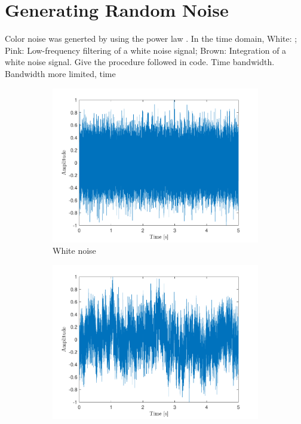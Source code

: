 \documentclass[10pt]{article}
\begin{document}
\section{Generating Random Noise}
Color noise was generted by using the power law $$. In the time domain, White: ; Pink: Low-frequency filtering of a white noise signal; Brown: Integration of a white noise signal. Give the procedure followed in code. Time bandwidth. Bandwidth more limited, time

\begin{figure}[ht]
    \centering
    \begin{subfigure}[b]{0.31\textwidth}
        \includegraphics[width=\textwidth]{problem11_white_noise_time.pdf}
        \caption{White noise}
    \end{subfigure}
    \quad
    \begin{subfigure}[b]{0.31\textwidth}
        \includegraphics[width=\textwidth]{problem11_pink_noise_time.pdf}

\end{subfigure}
\end{figure}
\end{document}
